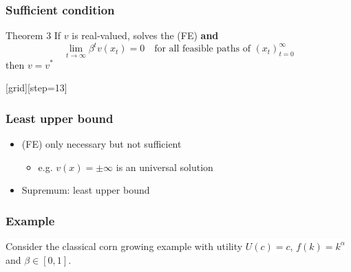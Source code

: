 \documentclass[aspectratio=169]{beamer}
\begin{document}
\begin{frame}
\frametitle{Sufficient condition}
\begin{block}{Theorem 3}
If $v$ is real-valued, solves the (FE) \textbf{and}
\begin{equation*}
\lim_{t \to \infty} \beta^{t}v(x_{t}) = 0 \quad \textrm{for all feasible paths of } (x_t)^{\infty}_{t=0}
\end{equation*}
then $v = v^*$
\end{block}
\end{frame}

{
[grid][step=13]
\begin{frame}
\frametitle{Least upper bound}
\begin{itemize}
\item (FE) only necessary but not sufficient
\begin{itemize}
\item e.g. $v(x) = \pm \infty$ is an universal solution
\end{itemize}
\item Supremum: least upper bound
\end{itemize}
\end{frame}

\begin{frame}
\end{frame}

\begin{frame}[t]
\frametitle{Example}
\colorbox{white}{
Consider the classical corn growing example with utility $U(c)=c$, $f(k)=k^{\alpha}$ and $\beta \in [0,1]$.}
\end{frame}

}
\end{document}
